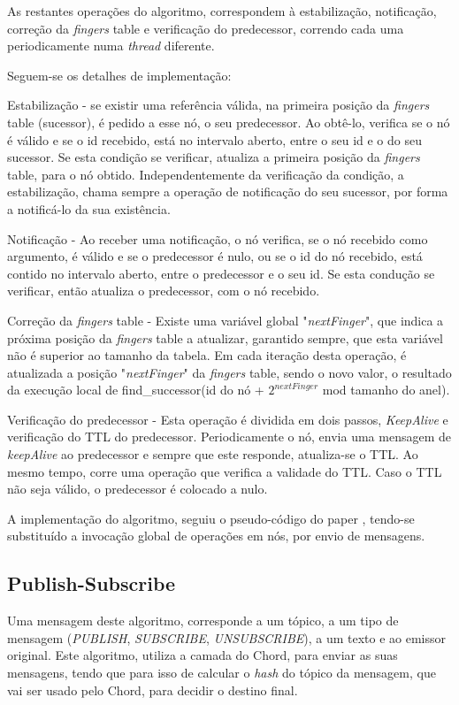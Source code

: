 \documentclass[12pt]{article}
\begin{document}
As restantes operações do algoritmo, correspondem à estabilização, notificação, correção da \emph{fingers} table e verificação do predecessor, correndo cada uma periodicamente numa \emph{thread} diferente.

Seguem-se os detalhes de implementação:

Estabilização - se existir uma referência válida, na primeira posição da \emph{fingers} table (sucessor), é pedido a esse nó, o seu predecessor. Ao obtê-lo, verifica se o nó é válido e se o id recebido, está no intervalo aberto, entre o seu id e o do seu sucessor. Se esta condição se verificar, atualiza a primeira posição da \emph{fingers} table, para o nó obtido. Independentemente da verificação da condição, a estabilização, chama sempre a operação de notificação do seu sucessor, por forma a notificá-lo da sua existência.

Notificação - Ao receber uma notificação, o nó verifica, se o nó recebido como argumento, é válido e se o predecessor é nulo, ou se o id do nó recebido, está contido no intervalo aberto, entre o predecessor e o seu id. Se esta condução se verificar, então atualiza o predecessor, com o nó recebido.

Correção da \emph{fingers} table - Existe uma variável global "\emph{nextFinger}", que indica a próxima posição da \emph{fingers} table a atualizar, garantido sempre, que esta variável não é superior ao tamanho da tabela. Em cada iteração desta operação, é  atualizada a posição "\emph{nextFinger}" da \emph{fingers} table, sendo o novo valor, o resultado da execução local de find\_successor(id do nó + $2^{nextFinger}$ mod tamanho do anel).

Verificação do predecessor - Esta operação é dividida em dois passos, \emph{KeepAlive} e verificação do TTL do predecessor. Periodicamente o nó, envia uma mensagem de \emph{keepAlive} ao predecessor e sempre que este responde, atualiza-se o TTL.  Ao mesmo tempo, corre uma operação que verifica a validade do TTL. Caso o TTL não seja válido, o predecessor é colocado a nulo.

A implementação do algoritmo, seguiu o pseudo-código do paper \cite{b2}, tendo-se substituído a invocação global de operações em nós, por envio de mensagens.

\newpage
\subsection{Publish-Subscribe}

Uma mensagem deste algoritmo, corresponde a um tópico, a um tipo de mensagem (\emph{PUBLISH}, \emph{SUBSCRIBE}, \emph{UNSUBSCRIBE}), a um texto e ao emissor original. Este algoritmo, utiliza a camada do Chord, para enviar as suas mensagens, tendo que para isso de calcular o \emph{hash} do tópico da mensagem, que vai ser usado pelo Chord,  para decidir o destino final.
\end{document}
